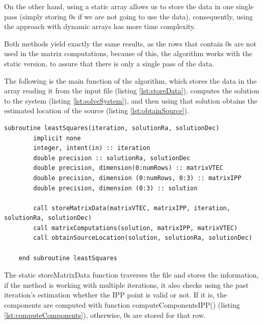 On the other hand, using a static array allows us to store the data in one single pass (simply storing 0s if we are not going to use the data), consequently, using the approach with dynamic arrays has more time complexity.

Both methods yield exactly the same results, as the rows that contain 0s are not used in the matrix computations, because of this, the algorithm works with the static version, to assure that there is only a single pass of the data.

The following is the main function of the algorithm, which stores the data in the array reading it from the input file (listing \ref{lst:storeData}), computes the solution to the system (listing \ref{lst:solveSystem}), and then using that solution obtains the estimated location of the source (listing \ref{lst:obtainSource}). \\

\begin{minipage}{\linewidth}
	\label{lst:main}
	\begin{lstlisting}[style=myFortranStyle, caption=Main Least Squares function]
	subroutine leastSquares(iteration, solutionRa, solutionDec)
		implicit none
		integer, intent(in) :: iteration
		double precision :: solutionRa, solutionDec
		double precision, dimension(0:numRows) :: matrixVTEC
		double precision, dimension (0:numRows, 0:3) :: matrixIPP
		double precision, dimension (0:3) :: solution
		
		call storeMatrixData(matrixVTEC, matrixIPP, iteration, solutionRa, solutionDec)
		call matrixComputations(solution, matrixIPP, matrixVTEC)
		call obtainSourceLocation(solution, solutionRa, solutionDec)
	
	end subroutine leastSquares\end{lstlisting}
\end{minipage}

The static storeMatrixData function traverses the file and stores the information, if the method is working with multiple iterations, it also checks using the past iteration's estimation whether the IPP point is valid or not. If it is, the components are computed with function computeComponentsIPP() (listing \ref{lst:computeComponents}), otherwise, 0s are stored for that row.

